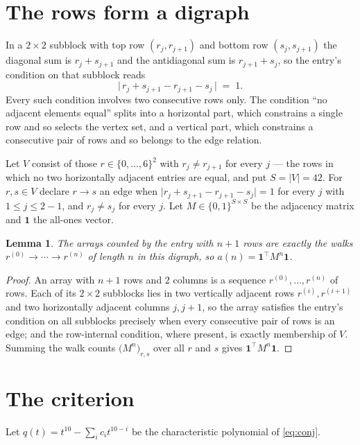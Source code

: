 \documentclass[11pt,a4paper]{article}
\theoremstyle{plain}
\newtheorem{lemma}[theorem]{Lemma}
\theoremstyle{definition}
\begin{document}
\section{The rows form a digraph}

In a $2\times2$ subblock with top row $(r_j,r_{j+1})$ and bottom row $(s_j,s_{j+1})$ the
diagonal sum is $r_j+s_{j+1}$ and the antidiagonal sum is $r_{j+1}+s_j$, so the entry's
condition on that subblock reads
\[
\bigl|\,r_j+s_{j+1}-r_{j+1}-s_j\,\bigr|\;=\;1.
\]
Every such condition involves two consecutive rows only. The condition ``no adjacent elements equal'' splits into a horizontal
part, which constrains a single row and so selects the vertex set, and a vertical part,
which constrains a consecutive pair of rows and so belongs to the edge relation.

Let $V$ consist of those $r\in\{0,\dots,6\}^{2}$ with $r_j\ne r_{j+1}$ for every
$j$ --- the rows in which no two horizontally adjacent entries are equal, and put $S=|V|=42$. For $r,s\in V$ declare $r\to s$ an edge
when $\bigl|r_j+s_{j+1}-r_{j+1}-s_j\bigr|=1$ for every $j$ with
$1\le j\le2-1$, and $r_j\ne s_j$ for every $j$. Let $M\in\{0,1\}^{S\times S}$ be the adjacency matrix and $\mathbf{1}$
the all-ones vector.

\begin{lemma}\label{lem:walk}
The arrays counted by the entry with $n+1$ rows are exactly the walks
$r^{(0)}\to\cdots\to r^{(n)}$ of length $n$ in this digraph, so
$a(n)=\mathbf{1}^{\!\top}M^{n}\mathbf{1}$.
\end{lemma}

\begin{proof}
An array with $n+1$ rows and $2$ columns is a sequence $r^{(0)},\dots,r^{(n)}$ of
rows. Each of its $2\times2$ subblocks lies in two vertically adjacent rows
$r^{(i)},r^{(i+1)}$ and two horizontally adjacent columns $j,j+1$, so the array satisfies
the entry's condition on all subblocks precisely when every consecutive pair of rows is an
edge; and the row-internal condition, where present, is exactly membership of $V$. Summing
the walk counts $\bigl(M^{n}\bigr)_{r,s}$ over all $r$ and $s$ gives
$\mathbf{1}^{\!\top}M^{n}\mathbf{1}$.
\end{proof}

\section{The criterion}

Let $q(t)=t^{10}-\sum_i c_i t^{10-i}$ be the characteristic polynomial of
\eqref{eq:conj}.
\end{document}
